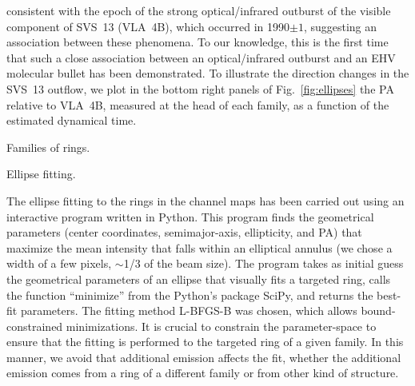 \documentclass[12pt]{mythesis}
\begin{document}
  consistent with the epoch of the strong optical/infrared outburst of the visible component of SVS~13 (VLA~4B), which occurred in 1990$\pm1$, suggesting an association between these phenomena. To our knowledge, this is the first time that such a close association between an optical/infrared outburst and an EHV molecular bullet has been demonstrated.
  To illustrate the direction changes in the SVS~13 outflow, we plot in the bottom right panels of Fig.~\ref{fig:ellipses} the PA relative to VLA~4B, measured at the head of each family, as a function of the estimated dynamical time.

 Families of rings.

Ellipse fitting. %

The ellipse fitting to the rings in the channel maps has been carried out using an interactive program written in Python. This program finds the geometrical parameters (center coordinates, semimajor-axis, ellipticity, and PA) that maximize the mean intensity that falls within an elliptical annulus (we chose a width of a few pixels, $\sim$1/3 of the beam size). The program takes as initial guess the geometrical parameters of an ellipse that visually fits a targeted ring, calls the function ``minimize'' from the Python's package {\sc SciPy}, and returns the best-fit parameters. The fitting method L-BFGS-B was chosen, which allows bound-constrained minimizations. It is crucial to constrain the parameter-space to ensure that the fitting is performed to the targeted ring of a given family. In this manner, we avoid that additional emission affects the fit, whether the additional emission comes from a ring of a different family or from other kind of structure. 
\end{document}
